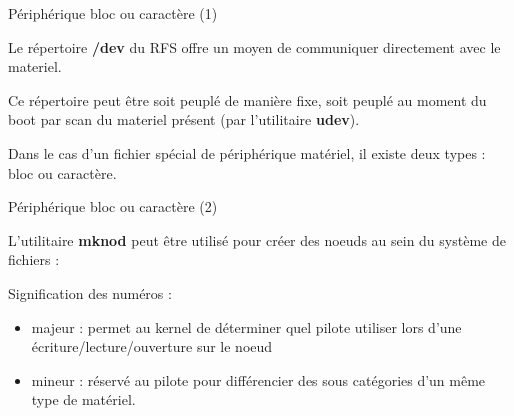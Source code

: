 \documentclass[12pt, t]{beamer}
\newcommand{\bi}{\begin{itemize}}
\newcommand{\ei}{\end{itemize}}
\begin{document}
\begin{frame}{Périphérique bloc ou caractère (1)}

    \vspace{20pt}
    Le répertoire {\textbf{/dev}} du RFS offre un moyen de communiquer
    directement avec le materiel.

    {
        \vspace{20pt}
        Ce répertoire peut être soit peuplé de manière fixe, soit peuplé au moment
        du boot par scan du materiel présent (par l'utilitaire {\textbf{udev}}).
    }

    {
        \vspace{20pt}
        Dans le cas d'un fichier spécial de périphérique matériel, il existe deux
        types : bloc ou caractère.
    }

\end{frame}


\begin{frame}{Périphérique bloc ou caractère (2)}

    \vspace{10pt}
    L'utilitaire {\textbf{mknod}} peut être utilisé pour créer des noeuds au
    sein du système de fichiers :

    \vspace{10pt}
    \lstnod

    {
        Signification des numéros :
        \bi
        \item majeur : permet au kernel de déterminer quel pilote utiliser lors
              d'une écriture/lecture/ouverture sur le noeud
        \item mineur : réservé au pilote pour différencier des sous catégories
              d'un même type de matériel.
        \ei
    }

\end{frame}
\end{document}
